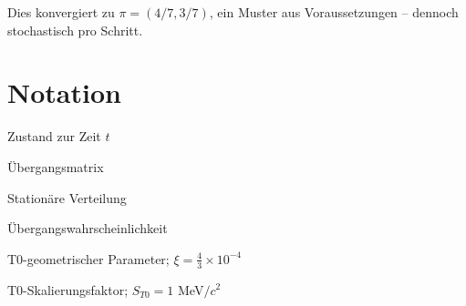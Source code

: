 	Dies konvergiert zu $\pi = (4/7, 3/7)$, ein Muster aus Voraussetzungen – dennoch stochastisch pro Schritt.
	
	\section{Notation}
	
	\begin{description}[leftmargin=1cm]
		\item[$X_t$] Zustand zur Zeit $t$
		\item[$P$] Übergangsmatrix
		\item[$\pi$] Stationäre Verteilung
		\item[$p_{ij}$] Übergangswahrscheinlichkeit
		\item[$\xi$] T0-geometrischer Parameter; $\xi = \frac{4}{3} \times 10^{-4}$
		\item[$S_{T0}$] T0-Skalierungsfaktor; $S_{T0} = 1$ MeV$/c^2$
	\end{description}
